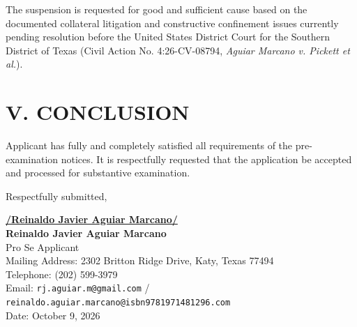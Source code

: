 \documentclass[11pt,letterpaper]{article}
\begin{document}
The suspension is requested for good and sufficient cause based on the documented collateral litigation and constructive confinement issues currently pending resolution before the United States District Court for the Southern District of Texas (Civil Action No. 4:26-CV-08794, \textit{Aguiar Marcano v. Pickett et al.}).

\section*{V. CONCLUSION}

Applicant has fully and completely satisfied all requirements of the pre-examination notices. It is respectfully requested that the application be accepted and processed for substantive examination.

\vspace{0.8cm}
\begin{singlespace}
\noindent Respectfully submitted, \par\vspace{1.5cm}
\underline{\textbf{/Reinaldo Javier Aguiar Marcano/}} \\
\textbf{Reinaldo Javier Aguiar Marcano} \\
Pro Se Applicant \\
Mailing Address: 2302 Britton Ridge Drive, Katy, Texas 77494 \\
Telephone: (202) 599-3979 \\
Email: \texttt{rj.aguiar.m@gmail.com} / \texttt{reinaldo.aguiar.marcano@isbn9781971481296.com} \\
Date: October 9, 2026
\end{singlespace}
\end{document}
